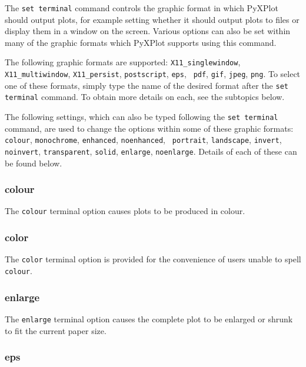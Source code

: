 The {\tt set terminal} command controls the graphic format in which PyXPlot
should output plots, for example setting whether it should output plots to files
or display them in a window on the screen. Various options can also be set
within many of the graphic formats which PyXPlot supports using this command.

The following graphic formats are supported:  {\tt X11\_singlewindow},
\newline\noindent %
{\tt X11\_multiwindow}, {\tt X11\_persist}, {\tt postscript}, {\tt eps}, {\tt
pdf}, {\tt gif}, {\tt jpeg}, {\tt png}. To select one of these formats, simply
type the name of the desired format after the {\tt set terminal} command. To
obtain more details on each, see the subtopics below.

The following settings, which can also be typed following the {\tt set terminal}
command, are used to change the options within some of these graphic formats:
{\tt colour}, {\tt monochrome}, {\tt enhanced}, {\tt noenhanced}, {\tt
portrait}, {\tt landscape}, {\tt invert}, {\tt noinvert}, {\tt transparent},
{\tt solid}, {\tt enlarge}, {\tt noenlarge}. Details of each of these can be
found below.

\subsubsection{colour}

The {\tt colour} terminal option causes plots to be produced in colour.

\subsubsection{color}

The {\tt color} terminal option is provided for the convenience of users unable
to spell {\tt colour}.

\subsubsection{enlarge}

The {\tt enlarge} terminal option causes the complete plot to be enlarged or
shrunk to fit the current paper size.

\subsubsection{eps}

